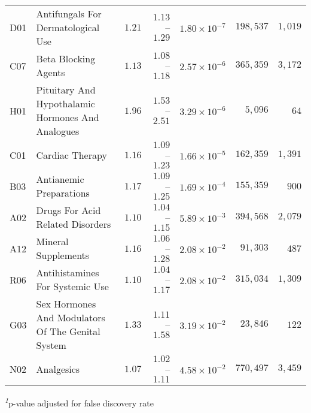 \begin{longtable}{llrrrrr}
D01 & Antifungals For Dermatological Use & $1.21$ & $1.13$–$1.29$ & $1.80 \times 10^{-7}$ & $198,537$ & $1,019$ \\ 
C07 & Beta Blocking Agents & $1.13$ & $1.08$–$1.18$ & $2.57 \times 10^{-6}$ & $365,359$ & $3,172$ \\ 
H01 & Pituitary And Hypothalamic Hormones And Analogues & $1.96$ & $1.53$–$2.51$ & $3.29 \times 10^{-6}$ & $5,096$ & $64$ \\ 
C01 & Cardiac Therapy & $1.16$ & $1.09$–$1.23$ & $1.66 \times 10^{-5}$ & $162,359$ & $1,391$ \\ 
B03 & Antianemic Preparations & $1.17$ & $1.09$–$1.25$ & $1.69 \times 10^{-4}$ & $155,359$ & $900$ \\ 
A02 & Drugs For Acid Related Disorders & $1.10$ & $1.04$–$1.15$ & $5.89 \times 10^{-3}$ & $394,568$ & $2,079$ \\ 
A12 & Mineral Supplements & $1.16$ & $1.06$–$1.28$ & $2.08 \times 10^{-2}$ & $91,303$ & $487$ \\ 
R06 & Antihistamines For Systemic Use & $1.10$ & $1.04$–$1.17$ & $2.08 \times 10^{-2}$ & $315,034$ & $1,309$ \\ 
G03 & Sex Hormones And Modulators Of The Genital System & $1.33$ & $1.11$–$1.58$ & $3.19 \times 10^{-2}$ & $23,846$ & $122$ \\ 
N02 & Analgesics & $1.07$ & $1.02$–$1.11$ & $4.58 \times 10^{-2}$ & $770,497$ & $3,459$ \\ 
\bottomrule
\end{longtable}
\begin{minipage}{\linewidth}
\textsuperscript{\textit{1}}p-value adjusted for false discovery rate\\
\end{minipage}

